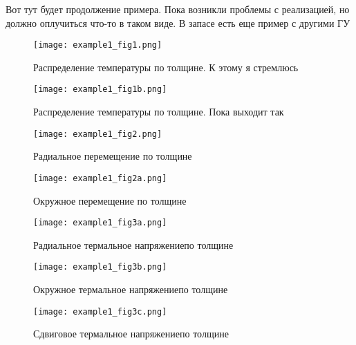{\color{red}
Вот тут будет продолжение примера. Пока возникли проблемы с реализацией, но должно оплучиться что-то в таком виде.
В запасе есть еще пример с другими ГУ
}
\begin{figure}[ht]
	\begin{minipage}[h]{.4\textwidth}
		\centering
		\texttt{[image: example1\_fig1.png]}
		\caption{Распределение температуры по толщине. К этому я стремлюсь}
	\end{minipage}
	\hfill
	\begin{minipage}[h]{.4\textwidth}
		\centering
		\texttt{[image: example1\_fig1b.png]}
		\caption{Распределение температуры по толщине. Пока выходит так}
	\end{minipage}
\end{figure}

\begin{figure}[ht]
	\begin{minipage}[h]{.4\textwidth}
		\centering
		\texttt{[image: example1\_fig2.png]}
		\caption{Радиальное перемещение по толщине}
	\end{minipage}
	\hfill
	\begin{minipage}[h]{.4\textwidth}
		\centering
		\texttt{[image: example1\_fig2a.png]}
		\caption{Окружное перемещение по толщине}
	\end{minipage}
\end{figure}

\begin{figure}[ht]
	\begin{minipage}[h]{.4\textwidth}
		\centering
		\texttt{[image: example1\_fig3a.png]}
		\caption{Радиальное термальное напряжениепо толщине}
	\end{minipage}
	\hfill
	\begin{minipage}[h]{.4\textwidth}
		\centering
		\texttt{[image: example1\_fig3b.png]}
		\caption{Окружное термальное напряжениепо толщине}
	\end{minipage}
	\hfill
\begin{minipage}[h]{.4\textwidth}
	\centering
	\texttt{[image: example1\_fig3c.png]}
	\caption{Сдвиговое термальное напряжениепо толщине}
\end{minipage}
\end{figure}